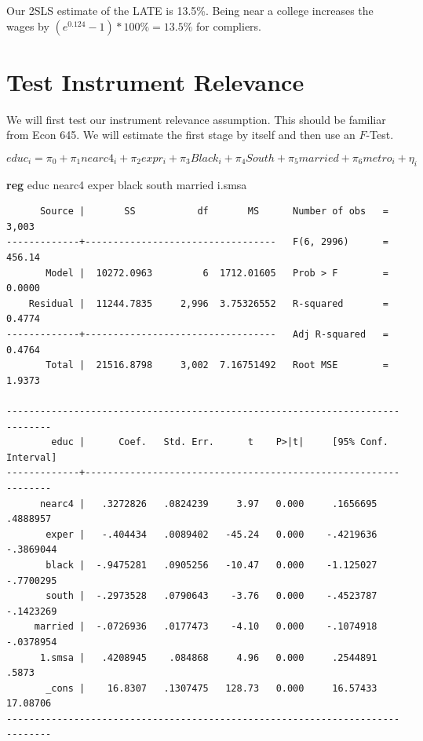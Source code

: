 \documentclass[
]{book}
\newenvironment{Shaded}{\begin{snugshade}}{\end{snugshade}}
\newcommand{\BaseNTok}[1]{\textcolor[rgb]{0.00,0.00,0.81}{#1}}
\newcommand{\KeywordTok}[1]{\textcolor[rgb]{0.13,0.29,0.53}{\textbf{#1}}}
\newcommand{\NormalTok}[1]{#1}
\begin{document}
Our 2SLS estimate of the LATE is 13.5\%. Being near a college increases the wages by \((e^{0.124}-1)*100\%=13.5\%\) for compliers.

\section{Test Instrument Relevance}\label{test-instrument-relevance}

We will first test our instrument relevance assumption. This should be familiar from Econ 645. We will estimate the first stage by itself and then use an \(F\)-Test.

\[ educ_i=\pi_0 + \pi_1 nearc4_i + \pi_2 expr_i + \pi_3 Black_i + \pi_4 South + \pi_5 married + \pi_6 metro_i + \eta_i \]

\begin{Shaded}
\begin{Highlighting}[]
\KeywordTok{reg}\NormalTok{ educ nearc4 exper }\BaseNTok{black}\NormalTok{ south married i.smsa}
\end{Highlighting}
\end{Shaded}

\begin{verbatim}
      Source |       SS           df       MS      Number of obs   =     3,003
-------------+----------------------------------   F(6, 2996)      =    456.14
       Model |  10272.0963         6  1712.01605   Prob > F        =    0.0000
    Residual |  11244.7835     2,996  3.75326552   R-squared       =    0.4774
-------------+----------------------------------   Adj R-squared   =    0.4764
       Total |  21516.8798     3,002  7.16751492   Root MSE        =    1.9373

------------------------------------------------------------------------------
        educ |      Coef.   Std. Err.      t    P>|t|     [95% Conf. Interval]
-------------+----------------------------------------------------------------
      nearc4 |   .3272826   .0824239     3.97   0.000     .1656695    .4888957
       exper |   -.404434   .0089402   -45.24   0.000    -.4219636   -.3869044
       black |  -.9475281   .0905256   -10.47   0.000    -1.125027   -.7700295
       south |  -.2973528   .0790643    -3.76   0.000    -.4523787   -.1423269
     married |  -.0726936   .0177473    -4.10   0.000    -.1074918   -.0378954
      1.smsa |   .4208945    .084868     4.96   0.000     .2544891       .5873
       _cons |    16.8307   .1307475   128.73   0.000     16.57433    17.08706
------------------------------------------------------------------------------
\end{verbatim}
\end{document}
